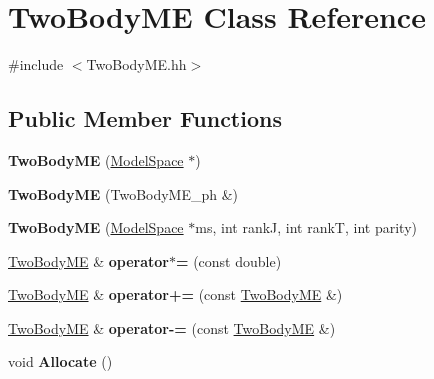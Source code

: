 \hypertarget{classTwoBodyME}{}\section{Two\+Body\+ME Class Reference}
\label{classTwoBodyME}


{\ttfamily \#include $<$Two\+Body\+M\+E.\+hh$>$}

\subsection*{Public Member Functions}
\begin{DoxyCompactItemize}
\item 
\mbox{\label{classTwoBodyME_ab83ecb946db481f645f203e76ea3db52}} 
{\bfseries Two\+Body\+ME} (\hyperlink{classModelSpace}{Model\+Space} $\ast$)
\item 
\mbox{\label{classTwoBodyME_a059914b2a21bac504d566540b611fe37}} 
{\bfseries Two\+Body\+ME} (Two\+Body\+M\+E\+\_\+ph \&)
\item 
\mbox{\label{classTwoBodyME_a493598d48d18fdd38c056ebf89376dc9}} 
{\bfseries Two\+Body\+ME} (\hyperlink{classModelSpace}{Model\+Space} $\ast$ms, int rankJ, int rankT, int parity)
\item 
\mbox{\label{classTwoBodyME_a0e511eefd39cdf5112d86bc4a0a0414a}} 
\hyperlink{classTwoBodyME}{Two\+Body\+ME} \& {\bfseries operator$\ast$=} (const double)
\item 
\mbox{\label{classTwoBodyME_acad0fc7cee36df621b8c4be14b3d5505}} 
\hyperlink{classTwoBodyME}{Two\+Body\+ME} \& {\bfseries operator+=} (const \hyperlink{classTwoBodyME}{Two\+Body\+ME} \&)
\item 
\mbox{\label{classTwoBodyME_a6922afa4634c683b899dd99a3d49f913}} 
\hyperlink{classTwoBodyME}{Two\+Body\+ME} \& {\bfseries operator-\/=} (const \hyperlink{classTwoBodyME}{Two\+Body\+ME} \&)
\item 
\mbox{\label{classTwoBodyME_a27ad6f262c2371d2f8eab3747af594ad}} 
void {\bfseries Allocate} ()
\item 
\mbox{\label{classTwoBodyME_a822e0bdd66bc67532f6e244eb496ff20}} 

\end{DoxyCompactItemize}
